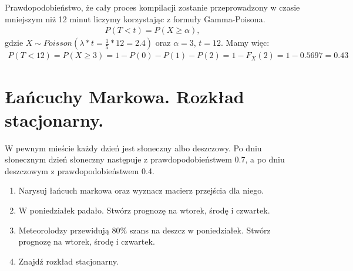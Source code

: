 \documentclass[main.tex]{subfiles}
\begin{document}
    Prawdopodobieństwo, że cały proces kompilacji zostanie przeprowadzony w
    czasie mniejszym niż 12 minut liczymy korzystając z formuły Gamma-Poisona.
    \begin{align*}
        P(T < t) = P(X \geq \alpha),
    \end{align*}
    gdzie $X \sim Poisson\left(\lambda*t = \frac{1}{5} * 12 = 2.4\right)$ oraz $\alpha = 3$, $t = 12$. Mamy więc:
    \begin{align*}
        P(T < 12) = P (X \geq 3) = 1 - P(0) - P(1) - P(2) = 1 - F_X(2) = 1 - 0.5697 = 0.43
    \end{align*}

    \newpage

    \section{Łańcuchy Markowa. Rozkład stacjonarny.}
    \begin{exercise}
        W pewnym mieście każdy dzień jest słoneczny albo deszczowy. Po dniu słonecznym dzień słoneczny
        następuje z prawdopodobieństwem 0.7, a po dniu deszczowym z prawdopodobieństwem 0.4.
        \begin{enumerate}
            \item Narysuj łańcuch markowa oraz wyznacz macierz przejścia dla niego.
            \item W poniedziałek padało. Stwórz prognozę na wtorek, środę i czwartek.
            \item Meteorolodzy przewidują 80\% szans na deszcz w poniedziałek. Stwórz prognozę na wtorek, środę i czwartek.
            \item Znajdź rozkład stacjonarny.
        \end{enumerate}
    \end{exercise}
\end{document}
